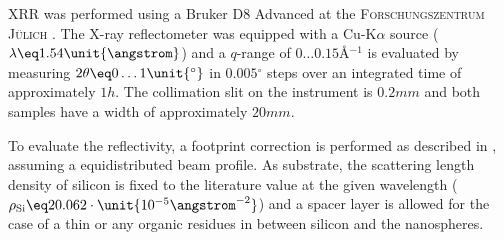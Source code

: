 \documentclass[\main/dresen_thesis.tex]{subfiles}
\begin{document}
    XRR was performed using a Bruker D8 Advanced at the \textsc{Forschungszentrum J\"ulich} .
    The X-ray reflectometer was equipped with a Cu-K$\alpha$ source ($\lambda \eq 1.54 \unit{\angstrom}$) and a $q$-range of $0 \ldots 0.15 \unit{\angstrom^{-1}}$ is evaluated by measuring $2 \theta \eq 0 \ldots 1 \unit{^\circ}$ in $0.005 \unit{^\circ}$ steps over an integrated time of approximately $1 \unit{h}$.
    The collimation slit on the instrument is $0.2 \unit{mm}$ and both samples have a width of approximately $20 \unit{mm}$.

    To evaluate the reflectivity, a footprint correction is performed as described in , assuming a equidistributed beam profile.
    As substrate, the scattering length density of silicon is fixed to the literature value at the given wavelength ($\rho_\mathrm{Si} \eq 20.062 \cdot \unit{10^{-5} \angstrom^{-2}}$) and a spacer layer is allowed for the case of a thin  or any organic residues in between silicon and the nanospheres.
\end{document}
